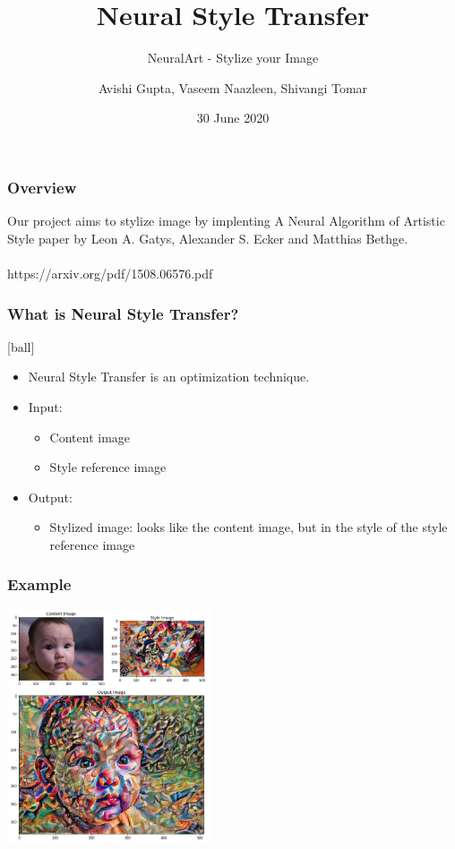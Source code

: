 \documentclass[14pt]{beamer}
\title[NST]{Neural Style Transfer}
\subtitle{NeuralArt - Stylize your Image}
\author[Team - 38]{Avishi Gupta, Vaseem Naazleen, Shivangi Tomar}
\date{30 June 2020}
\begin{document}
\begin{frame}
   \titlepage
\end{frame}

\begin{frame}
		\frametitle{Overview}
		Our project aims to stylize image by implenting A Neural Algorithm of Artistic Style paper by Leon A. Gatys, Alexander S. Ecker and Matthias Bethge. \\~\\

		https://arxiv.org/pdf/1508.06576.pdf
\end{frame}

\begin{frame}
		\frametitle{What is Neural Style Transfer?}
		\begin{itemize}
            \item Neural Style Transfer is an optimization technique.
           \item Input:
		\begin{itemize}
		     \item Content image
		     \item Style reference image
		\end{itemize}
             \item Output:
		\begin{itemize}
             \item Stylized image: looks like the content image, but  in the style of the style
        reference image
        \end{itemize}
        \end{itemize}
\end{frame}

\begin{frame}
    \frametitle{Example}
    \begin{center}
        \includegraphics[width=60mm]{baby.jpeg}
    \end{center}
\end{frame}
\end{document}
